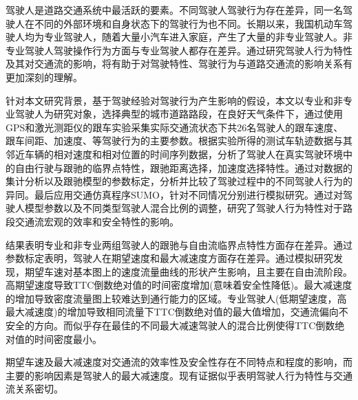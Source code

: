 驾驶人是道路交通系统中最活跃的要素。不同驾驶人驾驶行为存在差异，同一名驾驶人在不同的外部环境和自身状态下的驾驶行为也不同。长期以来，我国机动车驾驶人均为专业驾驶人，随着大量小汽车进入家庭，产生了大量的非专业驾驶人。非专业驾驶人驾驶操作行为方面与专业驾驶人都存在差异。通过研究驾驶人行为特性及其对交通流的影响，将有助于对驾驶特性、驾驶行为与道路交通流的影响关系有更加深刻的理解。

针对本文研究背景，基于驾驶经验对驾驶行为产生影响的假设，本文以专业和非专业驾驶人为研究对象，选择典型的城市道路路段，在良好天气条件下，通过使用GPS和激光测距仪的跟车实验采集实际交通流状态下共26名驾驶人的跟车速度、跟车间距、加速度、等驾驶行为的主要参数。根据实验所得的测试车轨迹数据与其邻近车辆的相对速度和相对位置的时间序列数据，分析了驾驶人在真实驾驶环境中的自由行驶与跟驰的临界点特性，跟驰距离选择，加速度选择特性。通过对数据的集计分析以及跟驰模型的参数标定，分析并比较了驾驶过程中的不同驾驶人行为的异同。最后应用交通仿真程序SUMO，针对不同情况分别进行模拟研究。通过对驾驶人模型参数以及不同类型驾驶人混合比例的调整，研究了驾驶人行为特性对于路段交通流宏观的效率和安全特性的影响。

结果表明专业和非专业两组驾驶人的跟驰与自由流临界点特性方面存在差异。通过参数标定表明，驾驶人在期望速度和最大减速度方面存在差异。通过模拟研究发现，期望车速对基本图上的速度流量曲线的形状产生影响，且主要在自由流阶段。高期望速度导致TTC倒数绝对值的时间密度增加(意味着安全性降低)。最大减速度的增加导致密度流量图上较难达到通行能力的区域。专业驾驶人(低期望速度，高最大减速度)的增加导致相同流量下TTC倒数绝对值的最大值增加，交通流偏向不安全的方向。而似乎存在最佳的不同最大减速驾驶人的混合比例使得TTC倒数绝对值的时间密度最小。

期望车速及最大减速度对交通流的效率性及安全性存在不同特点和程度的影响，而主要的影响因素是驾驶人的最大减速度。现有证据似乎表明驾驶人行为特性与交通流关系密切。